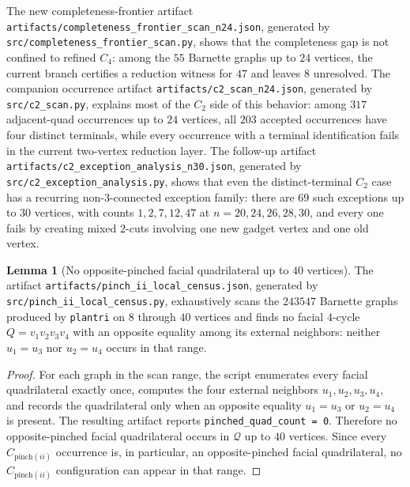 \documentclass[12pt]{article}
\theoremstyle{definition}
\newtheorem{lemma}[theorem]{Lemma}
\begin{document}
The new completeness-frontier artifact \texttt{artifacts/completeness\_frontier\_scan\_n24.json}, generated by \texttt{src/completeness\_frontier\_scan.py}, shows that the completeness gap is not confined to refined $C_4$: among the $55$ Barnette graphs up to $24$ vertices, the current branch certifies a reduction witness for $47$ and leaves $8$ unresolved. The companion occurrence artifact \texttt{artifacts/c2\_scan\_n24.json}, generated by \texttt{src/c2\_scan.py}, explains most of the $C_2$ side of this behavior: among $317$ adjacent-quad occurrences up to $24$ vertices, all $203$ accepted occurrences have four distinct terminals, while every occurrence with a terminal identification fails in the current two-vertex reduction layer. The follow-up artifact \texttt{artifacts/c2\_exception\_analysis\_n30.json}, generated by \texttt{src/c2\_exception\_analysis.py}, shows that even the distinct-terminal $C_2$ case has a recurring non-$3$-connected exception family: there are $69$ such exceptions up to $30$ vertices, with counts $1,2,7,12,47$ at $n=20,24,26,28,30$, and every one fails by creating mixed $2$-cuts involving one new gadget vertex and one old vertex.

\begin{lemma}[No opposite-pinched facial quadrilateral up to $40$ vertices]
\label{lem:pinch-local-census}
The artifact \texttt{artifacts/pinch\_ii\_local\_census.json}, generated by \texttt{src/pinch\_ii\_local\_census.py}, exhaustively scans the $243547$ Barnette graphs produced by \texttt{plantri} on $8$ through $40$ vertices and finds no facial $4$-cycle $Q=v_1v_2v_3v_4$ with an opposite equality among its external neighbors: neither $u_1=u_3$ nor $u_2=u_4$ occurs in that range.
\end{lemma}

\begin{proof}
For each graph in the scan range, the script enumerates every facial quadrilateral exactly once, computes the four external neighbors $u_1,u_2,u_3,u_4$, and records the quadrilateral only when an opposite equality $u_1=u_3$ or $u_2=u_4$ is present. The resulting artifact reports \texttt{pinched\_quad\_count = 0}. Therefore no opposite-pinched facial quadrilateral occurs in $\mathcal Q$ up to $40$ vertices. Since every $C_{\mathrm{pinch}(ii)}$ occurrence is, in particular, an opposite-pinched facial quadrilateral, no $C_{\mathrm{pinch}(ii)}$ configuration can appear in that range.
\end{proof}
\end{document}
